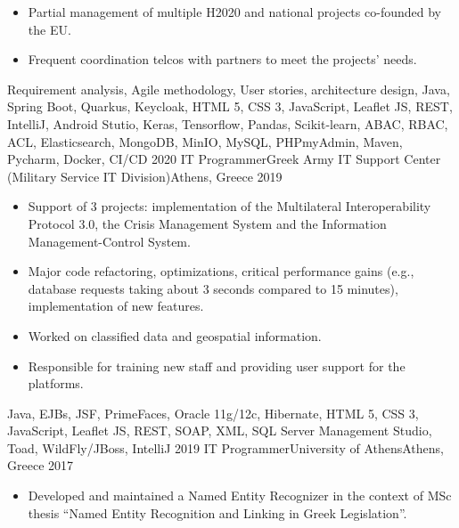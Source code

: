 \begin{experiences}
{\begin{itemize}
                        \item Partial management of multiple H2020 and national projects co-founded by the EU.

                        \item Frequent coordination telcos with partners to meet the projects' needs.

                    \end{itemize}
                    }
                    {Requirement analysis, Agile methodology, User stories, architecture design, Java, Spring Boot, Quarkus, Keycloak, HTML 5, CSS 3, JavaScript, Leaflet JS, REST, IntelliJ, Android Stutio, Keras, Tensorflow, Pandas, Scikit-learn, ABAC, RBAC, ACL, Elasticsearch, MongoDB, MinIO, MySQL, PHPmyAdmin, Maven, Pycharm, Docker, CI/CD}
  \emptySeparator
  \experience
    {2020}   {IT Programmer}{Greek Army IT Support Center (Military Service IT Division)}{Athens, Greece}
    {2019} {
                    \begin{itemize}
                      \item Support of 3 projects: implementation of the Multilateral Interoperability Protocol 3.0, the Crisis Management System
                      and the Information Management-Control System.

                      \item Major code refactoring, optimizations, critical performance gains (e.g., database requests taking about 3 seconds compared to 15 minutes), 
                      implementation of new features.

                      \item Worked on classified data and geospatial information.

                      \item Responsible for training new staff and providing user support for the platforms.
                    \end{itemize}
                    }
                    {Java, EJBs, JSF, PrimeFaces, Oracle 11g/12c, Hibernate, HTML 5, CSS 3, JavaScript, Leaflet JS, REST, SOAP, XML, SQL Server Management Studio, Toad, WildFly/JBoss, IntelliJ}
  \emptySeparator
  \experience
    {2019} {IT Programmer}{University of Athens}{Athens, Greece}
    {2017}    {
                    \begin{itemize}
                      \item Developed and maintained a Named Entity Recognizer in the context of MSc thesis ``Named Entity Recognition and Linking in Greek Legislation''.


\end{itemize}}
\end{experiences}
